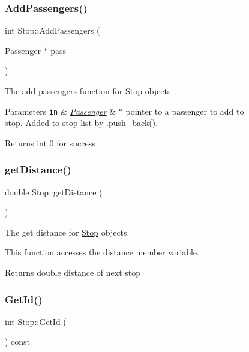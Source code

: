 \begin{figure}[H]
\begin{center}
\subsubsection{\texorpdfstring{Add\+Passengers()}{AddPassengers()}}
{\footnotesize\ttfamily int Stop\+::\+Add\+Passengers (\begin{DoxyParamCaption}\item[{\hyperlink{classPassenger}{Passenger} $\ast$}]{pass }\end{DoxyParamCaption})}



The add passengers function for \hyperlink{classStop}{Stop} objects. 


\begin{DoxyParams}[1]{Parameters}
\mbox{\tt in}  & {\em \hyperlink{classPassenger}{Passenger}} & $\ast$ pointer to a passenger to add to stop. Added to stop list by .push\+\_\+back().\\
\hline
\end{DoxyParams}
\begin{DoxyReturn}{Returns}
int 0 for success 
\end{DoxyReturn}
\mbox{\label{classStop_a75185ff04f33083582c98230fc3a6df4}} 
\subsubsection{\texorpdfstring{get\+Distance()}{getDistance()}}
{\footnotesize\ttfamily double Stop\+::get\+Distance (\begin{DoxyParamCaption}{ }\end{DoxyParamCaption})}



The get distance for \hyperlink{classStop}{Stop} objects. 

This function accesses the distance member variable.

\begin{DoxyReturn}{Returns}
double distance of next stop 
\end{DoxyReturn}
\mbox{\label{classStop_a2f3b845d5a338f197226c90696314904}} 
\subsubsection{\texorpdfstring{Get\+Id()}{GetId()}}
{\footnotesize\ttfamily int Stop\+::\+Get\+Id (\begin{DoxyParamCaption}{ }\end{DoxyParamCaption}) const}




\end{center}
\end{figure}
